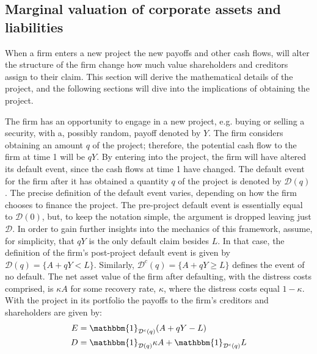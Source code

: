 \documentclass[../main.tex]{subfiles}
\begin{document}
    \subsection{Marginal valuation of corporate assets and liabilities}
        When a firm enters a new project the new payoffs and other cash flows,
        will alter the structure of the firm 
        change how much value shareholders and creditors assign to their claim.
        This section will derive the mathematical details of the project,
        and the following sections will dive into the implications of obtaining the project.

        The firm has an opportunity to engage in a new project, e.g. buying or selling a security,
        with a, possibly random, payoff denoted by $Y$.
        The firm considers obtaining an amount $q$ of the project;
        therefore, the potential cash flow to the firm at time 1 will be $qY$.
        By entering into the project, the firm will have altered its default event,
        since the cash flows at time 1 have changed.
        The default event for the firm after it has obtained a quantity $q$ of the project
        is denoted by $\mathcal{D}(q)$.
        The precise definition of the default event varies, 
        depending on how the firm chooses to finance the project.
        The pre-project default event is essentially equal to $\mathcal{D}(0)$,
        but, to keep the notation simple, the argument is dropped leaving just $\mathcal{D}$.
        In order to gain further insights into the mechanics of this framework, 
        assume, for simplicity, that $qY$ is the only default claim besides $L$. 
        In that case, the definition of the firm's post-project default event is given by 
        $\mathcal{D}(q) = \{A + qY < L\}$.
        Similarly, $\mathcal{D}^{c}(q) = \{A + qY \geq L\}$ defines the event of no default.
        The net asset value of the firm after defaulting, with the distress costs comprised, is $\kappa A$ for some recovery rate, $\kappa$, where the distress costs equal $1-\kappa$.
        With the project in its portfolio the payoffs to the firm's creditors and shareholders are given by:
            \begin{align*}
                E
                &= 
                \mathbbm{1}_{\mathcal{D}^{c}(q)}
                (A + qY - L)
                \\
                D 
                &= 
                \mathbbm{1}_{\mathcal{D}(q)}
                \kappa A 
                + 
                \mathbbm{1}_{\mathcal{D}^{c}(q)} 
                L
            \end{align*}
\end{document}
